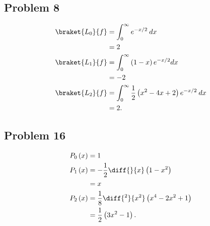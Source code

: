 \documentclass[10pt]{mypackage}
\begin{document}
\subsection{Problem 8}%
\begin{align*}
  \braket{L_0}{f} &= \int_{0}^{\infty} e^{-x/2}\:dx\\
                  &= 2\\
  \braket{L_1}{f} &= \int_{0}^{\infty}\left(1-x\right)e^{-x/2}dx\\
                  &= -2\\
  \braket{L_2}{f} &= \int_{0}^{\infty} \frac{1}{2}\left(x^2 - 4x + 2\right)e^{-x/2}\:dx\\
                  &= 2.
\end{align*}
\subsection{Problem 16}%
\begin{align*}
  P_0\left(x\right) &= 1\\
  P_1\left(x\right) &= -\frac{1}{2}\diff{}{x}\left(1-x^2\right)\\
                    &= x\\
  P_2\left(x\right) &= \frac{1}{8}\diff{^2}{x^2}\left(x^4 - 2x^2 + 1\right)\\
                    &= \frac{1}{2}\left(3x^2-1\right).
\end{align*}
\end{document}

